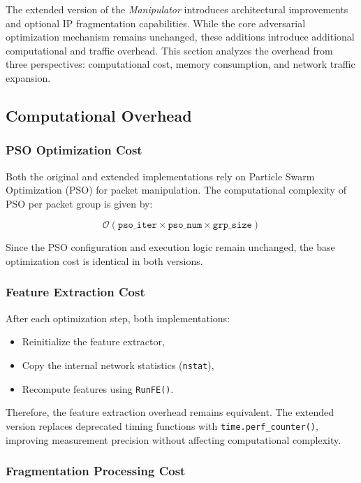 The extended version of the \textit{Manipulator} introduces architectural improvements and optional IP fragmentation capabilities. While the core adversarial optimization mechanism remains unchanged, these additions introduce additional computational and traffic overhead. This section analyzes the overhead from three perspectives: computational cost, memory consumption, and network traffic expansion.

\subsection{Computational Overhead}

\subsubsection{PSO Optimization Cost}

Both the original and extended implementations rely on Particle Swarm Optimization (PSO) for packet manipulation. The computational complexity of PSO per packet group is given by:

\begin{equation}
\mathcal{O}(\texttt{pso\_iter} \times \texttt{pso\_num} \times \texttt{grp\_size})
\end{equation}

Since the PSO configuration and execution logic remain unchanged, the base optimization cost is identical in both versions.

\subsubsection{Feature Extraction Cost}

After each optimization step, both implementations:
\begin{itemize}
    \item Reinitialize the feature extractor,
    \item Copy the internal network statistics (\texttt{nstat}),
    \item Recompute features using \texttt{RunFE()}.
\end{itemize}

Therefore, the feature extraction overhead remains equivalent. The extended version replaces deprecated timing functions with \texttt{time.perf\_counter()}, improving measurement precision without affecting computational complexity.

\subsubsection{Fragmentation Processing Cost}

